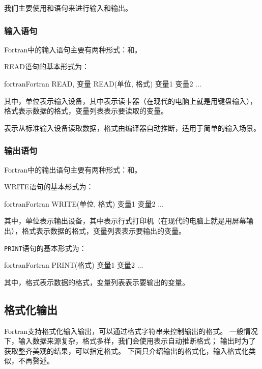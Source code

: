 我们主要使用和语句来进行输入和输出。

\subsubsection{输入语句}

Fortran中的输入语句主要有两种形式：和。

READ语句的基本形式为：
\begin{envcode}{fortran}{Fortran}
      READ, 变量
      READ(单位, 格式) 变量1 变量2 ...
\end{envcode}

其中，单位表示输入设备，其中表示读卡器（在现代的电脑上就是用键盘输入），格式表示数据的格式，变量列表表示要读取的变量。

表示从标准输入设备读取数据，格式由编译器自动推断，适用于简单的输入场景。

\subsubsection{输出语句}

Fortran中的输出语句主要有两种形式：和。


WRITE语句的基本形式为：
\begin{envcode}{fortran}{Fortran}
      WRITE(单位, 格式) 变量1 变量2 ...
\end{envcode}
其中，单位表示输出设备，其中表示行式打印机（在现代的电脑上就是用屏幕输出），格式表示数据的格式，变量列表表示要输出的变量。

\texttt{PRINT}语句的基本形式为：
\begin{envcode}{fortran}{Fortran}
      PRINT(格式) 变量1 变量2 ...
\end{envcode}
    
其中，格式表示数据的格式，变量列表表示要输出的变量。








\subsection{格式化输出}

Fortran支持格式化输入输出，可以通过格式字符串来控制输出的格式。
一般情况下，输入数据来源复杂，格式多样，我们会使用\code{*}表示自动推断格式；
输出时为了获取整齐美观的结果，可以指定格式。
下面只介绍输出的格式化，输入格式化类似，不再赘述。

